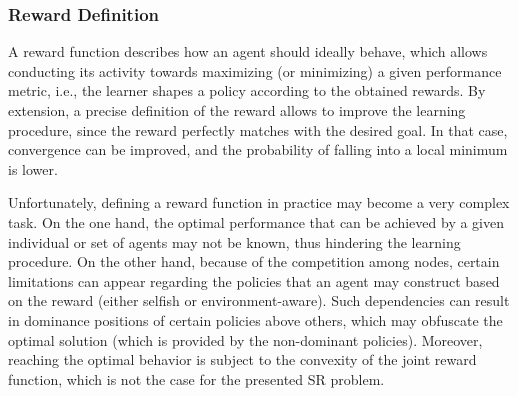 \documentclass[preprint,12pt]{elsarticle}
\begin{document}
\subsubsection{Reward Definition}
\label{subsubsection:reward}
A reward function describes how an agent should ideally behave, which allows conducting its activity towards maximizing (or minimizing) a given performance metric, i.e., the learner shapes a policy according to the obtained rewards. By extension, a precise definition of the reward allows to improve the learning procedure, since the reward perfectly matches with the desired goal. In that case, convergence can be improved, and the probability of falling into a local minimum is lower. 

Unfortunately, defining a reward function in practice may become a very complex task. On the one hand, the optimal performance that can be achieved by a given individual or set of agents may not be known, thus hindering the learning procedure. On the other hand, because of the competition among nodes, certain limitations can appear regarding the policies that an agent may construct based on the reward (either selfish or environment-aware). Such dependencies can result in dominance positions of certain policies above others, which may obfuscate the optimal solution (which is provided by the non-dominant policies). Moreover, reaching the optimal behavior is subject to the convexity of the joint reward function, which is not the case for the presented SR problem.
\end{document}
